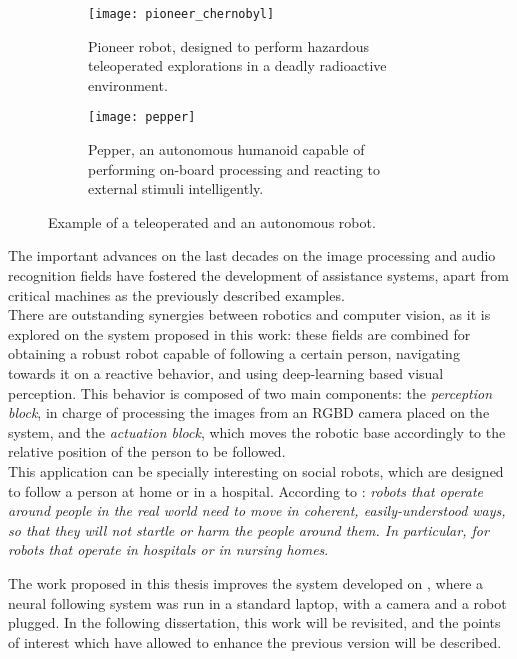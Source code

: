 \begin{figure}[h]
	\centering
	\begin{subfigure}[t]{0.45\textwidth}
		\centering
		\texttt{[image: pioneer\_chernobyl]}
		\caption{Pioneer robot, designed to perform hazardous teleoperated explorations in a deadly radioactive environment.}
		\label{fig:1_pioneer}
	\end{subfigure}
	\hfill
	\begin{subfigure}[t]{0.4\textwidth}
		\centering
		\texttt{[image: pepper]}
		\caption{Pepper, an autonomous humanoid capable of performing on-board processing and reacting to external stimuli intelligently.}
		\label{fig:1_pepper}
	\end{subfigure}
	\caption{Example of a teleoperated and an autonomous robot.}
	\label{fig:1_robots}
\end{figure}

The important advances on the last decades on the image processing and audio recognition fields have fostered the development of assistance systems, apart from critical machines as the previously described examples.\\



There are outstanding synergies between robotics and computer vision, as it is explored on the system proposed in this work: these fields are combined for obtaining a robust robot capable of following a certain person, navigating towards it on a reactive behavior, and using deep-learning based visual perception. This behavior is composed of two main components: the \textit{perception block}, in charge of processing the images from an RGBD camera placed on the system, and the \textit{actuation block}, which moves the robotic base accordingly to the relative position of the person to be followed.\\

This application can be specially interesting on social robots, which are designed to follow a person at home or in a hospital. According to \cite{natural_personfollowing}: \textit{robots that operate around people in the real world need to move in coherent, easily-understood ways, so that they will not startle or harm the people around them. In particular, for robots that operate in hospitals or in nursing homes}. 



The work proposed in this thesis improves the system developed on \cite{tfg}, where a neural following system was run in a standard laptop, with a camera and a robot plugged. In the following dissertation, this work will be revisited, and the points of interest which have allowed to enhance the previous version will be described.\\
	
